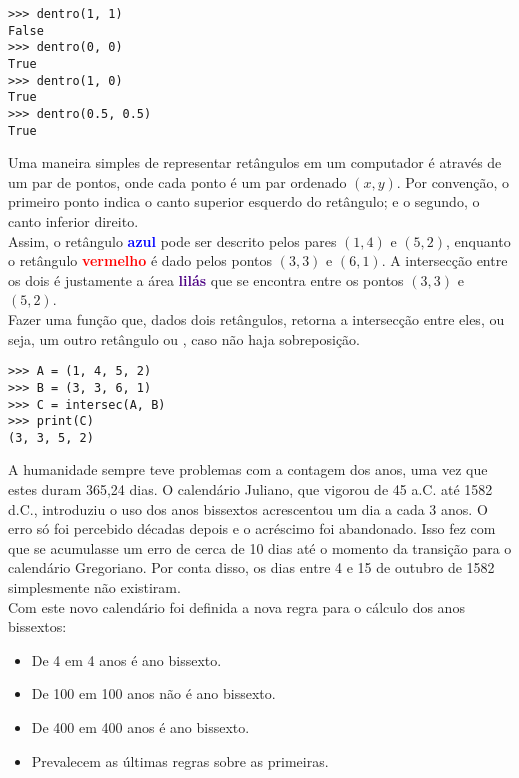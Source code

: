 \documentclass[12pt]{article}
\begin{document}
	\example
	\begin{lstlisting}
>>> dentro(1, 1)
False
>>> dentro(0, 0)
True
>>> dentro(1, 0)
True
>>> dentro(0.5, 0.5)
True
	\end{lstlisting}
	
	\pagebreak
	
	
	Uma maneira simples de representar retângulos em um computador é através de um par de pontos, onde cada ponto é um par ordenado $(x, y)$. Por convenção, o primeiro ponto indica o canto superior esquerdo do retângulo; e o segundo, o canto inferior direito.\\
	
	
	
	Assim, o retângulo \textcolor{blue}{\textbf{azul}} pode ser descrito pelos pares $(1, 4)$ e $(5, 2)$, enquanto o retângulo \textcolor{red}{\textbf{vermelho}} é dado pelos pontos $(3, 3)$ e $(6, 1)$. A intersecção entre os dois é justamente a área \textcolor{indigo}{\textbf{lilás}} que se encontra entre os pontos $(3, 3)$ e $(5, 2)$. \\
	
	\quest Fazer uma função que, dados dois retângulos, retorna a intersecção entre eles, ou seja, um outro retângulo ou , caso não haja sobreposição.\\
	
	\example
	\begin{lstlisting}
>>> A = (1, 4, 5, 2)
>>> B = (3, 3, 6, 1)
>>> C = intersec(A, B)
>>> print(C)
(3, 3, 5, 2)
	\end{lstlisting}
	
	\pagebreak
	
	
	A humanidade sempre teve problemas com a contagem dos anos, uma vez que estes duram 365,24 dias. O calendário Juliano, que vigorou de 45 a.C. até 1582 d.C., introduziu o uso dos anos bissextos acrescentou um dia a cada 3 anos. O erro só foi percebido décadas depois e o acréscimo foi abandonado. Isso fez com que se acumulasse um erro de cerca de 10 dias até o momento da transição para o calendário Gregoriano. Por conta disso, os dias entre 4 e 15 de outubro de 1582 simplesmente não existiram.\\
	
	Com este novo calendário foi definida a nova regra para o cálculo dos anos bissextos:
	
	\begin{itemize}
		\item De 4 em 4 anos é ano bissexto.
		\item De 100 em 100 anos não é ano bissexto.
		\item De 400 em 400 anos é ano bissexto.
		\item Prevalecem as últimas regras sobre as primeiras.
	\end{itemize}
	
\end{document}
